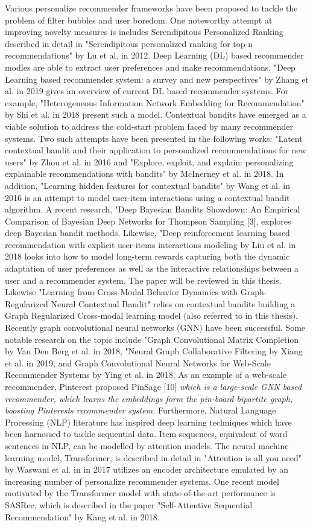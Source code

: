 Various personalize recommender frameworks have been proposed to tackle the problem of filter bubbles and user boredom. One noteworthy attempt at improving novelty measures is includes Serendipitous Personalized Ranking described in detail in "Serendipitous personalized ranking for top-n recommendations" by Lu et al. in 2012. Deep Learning (DL) based recommender modles are able to extract user preferences and make recommendations. "Deep Learning based recommender system: a survey and new perspectives" by Zhang et al. in 2019 gives an overview of current DL based recommender systems. For example, "Heterogeneous Information Network Embedding for Recommendation" by Shi et al. in 2018 present such a model. Contextual bandits have emerged as a viable solution to address the cold-start problem faced by many recommender systems. Two such attempts  have been presented in the following works: "Latent contextual bandit and their application to personalized recommendations for new users" by Zhou et al. in 2016 and "Explore, exploit, and explain: personalizing explainable recommendations with bandits" by McInerney et al. in 2018. In addition, "Learning hidden features for contextual bandits" by Wang et al. in 2016 is an attempt to model user-item interactions using a contextual bandit algorithm. A recent research, "Deep Bayesian Bandits Showdown: An Empirical Comparison of Bayesian Deep Networks for Thompson Sampling [3], explores deep Bayesian bandit methods. Likewise, "Deep reinforcement learning based recommendation with explicit user-items interactions modeling by Liu et al. in 2018 looks into how to model long-term rewards capturing both the dynamic adaptation of user preferences as well as the interactive relationships between a user and a recommender system. The paper will be reviewed in this thesis. Likewise "Learning from Cross-Modal Behavior Dynamics with Graph-Regularized Neural Contextual Bandit" relies on contextual bandits building a Graph Regularized Cross-modal learning model (also referred to in this thesis). Recently graph convolutional neural networks (GNN) have been successful. Some notable research on the topic include "Graph Convolutional Matrix Completion by Van Den Berg et al. in 2018, "Neural Graph Collaborative Filtering by Xiang et al. in 2019, and Graph Convolutional Neural Networks for Web-Scale Recommender Systems by Ying et al. in 2018. As an example of a web-scale recommender, Pinterest proposed PinSage [10]  \textit{which is a large-scale GNN based recommender, which learns the embeddings form the pin-board bipartite graph, boosting Pinterests recommender system.} Furthermore, Natural Language Processing (NLP) literature has inspired deep learning techniques which have been harnessed to tackle sequential data. Item sequences, equivalent of word sentences in NLP, can be modelled by attention models. The neural machine learning model, Transformer, is described in detail in "Attention is all you need" by Waswani et al. in in 2017 utilizes an encoder architecture emulated by an increasing number of personalize recommender systems. One recent model motivated by the  Transformer model with state-of-the-art performance is SASRec, which is described in the paper "Self-Attentive Sequential Recommendation" by Kang et al. in 2018. 

